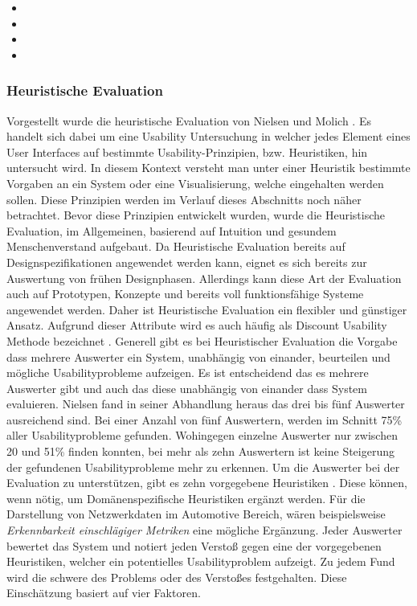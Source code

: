 \documentclass[draft=false
              ,paper=a4
              ,twoside=false
              ,fontsize=11pt
              ,headsepline
              ,BCOR10mm
              ,DIV11
              ]{scrbook}
\begin{document}
\begin{itemize}
  \item {}
  \item {}
  \item {}
  \item {}
\end{itemize}

\subsubsection{Heuristische Evaluation} %
\label{ssub:heuristische_evaluation}
Vorgestellt wurde die heuristische Evaluation von Nielsen und Molich \cite{nielsen_heuristic_1990}. Es handelt sich dabei um eine Usability Untersuchung in welcher jedes Element eines User Interfaces auf bestimmte Usability-Prinzipien, bzw. Heuristiken, hin untersucht wird. In diesem Kontext versteht man unter einer Heuristik bestimmte Vorgaben an ein System oder eine Visualisierung, welche eingehalten werden sollen. Diese Prinzipien werden im Verlauf dieses Abschnitts noch näher betrachtet. Bevor diese Prinzipien entwickelt wurden, wurde die Heuristische Evaluation, im Allgemeinen, basierend auf Intuition und gesundem Menschenverstand aufgebaut. Da Heuristische Evaluation bereits auf Designspezifikationen angewendet werden kann, eignet es sich bereits zur Auswertung von frühen Designphasen. Allerdings kann diese Art der Evaluation auch auf Prototypen, Konzepte und bereits voll funktionsfähige Systeme angewendet werden. Daher ist Heuristische Evaluation ein flexibler und günstiger Ansatz. Aufgrund dieser Attribute wird es auch häufig als Discount Usability Methode bezeichnet \cite{kane_finding_2003}\cite{nielsen_usability_1994}.
Generell gibt es bei Heuristischer Evaluation die Vorgabe dass mehrere Auswerter ein System, unabhängig von einander, beurteilen und mögliche Usabilityprobleme aufzeigen. Es ist entscheidend das es mehrere Auswerter gibt und auch das diese unabhängig von einander dass System evaluieren. Nielsen fand in seiner Abhandlung heraus das drei bis fünf Auswerter ausreichend sind. Bei einer Anzahl von fünf Auswertern, werden im Schnitt 75\% aller Usabilityprobleme gefunden. Wohingegen einzelne Auswerter nur zwischen 20 und 51\% finden konnten, bei mehr als zehn Auswertern ist keine Steigerung der gefundenen Usabilityprobleme mehr zu erkennen.
Um die Auswerter bei der Evaluation zu unterstützen, gibt es zehn vorgegebene Heuristiken \cite{nielsen_usability_1994}. Diese können, wenn nötig, um Domänenspezifische Heuristiken ergänzt werden. Für die Darstellung von Netzwerkdaten im Automotive Bereich, wären beispielsweise \textit{Erkennbarkeit einschlägiger Metriken} eine mögliche Ergänzung. 
Jeder Auswerter bewertet das System und notiert jeden Verstoß gegen eine der vorgegebenen Heuristiken, welcher ein potentielles Usabilityproblem aufzeigt. Zu jedem Fund wird die schwere des Problems oder des Verstoßes festgehalten. Diese Einschätzung basiert auf vier Faktoren.
\end{document}

